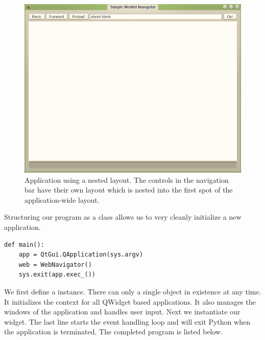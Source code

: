 \begin{figure}[h]
\centering
\includegraphics[scale=.5]{layout.png}
\caption{Application using a nested layout.
The controls in the navigation bar have their own layout which is nested into the first spot of the application-wide layout.}
\label{fig:withlayout}
\end{figure}

Structuring our program as a class allows us to very cleanly initialize a new application.
\begin{lstlisting}
def main():
    app = QtGui.QApplication(sys.argv)
    web = WebNavigator()
    sys.exit(app.exec_())
\end{lstlisting}
We first define a  instance.
There can only a single  object in existence at any time.
It initializes the context for all QWidget based applications.
It also manages the windows of the application and handles user input.
Next we instantiate our  widget.
The last line starts the event handling loop and will exit Python when the application is terminated.
The completed program is listed below.


